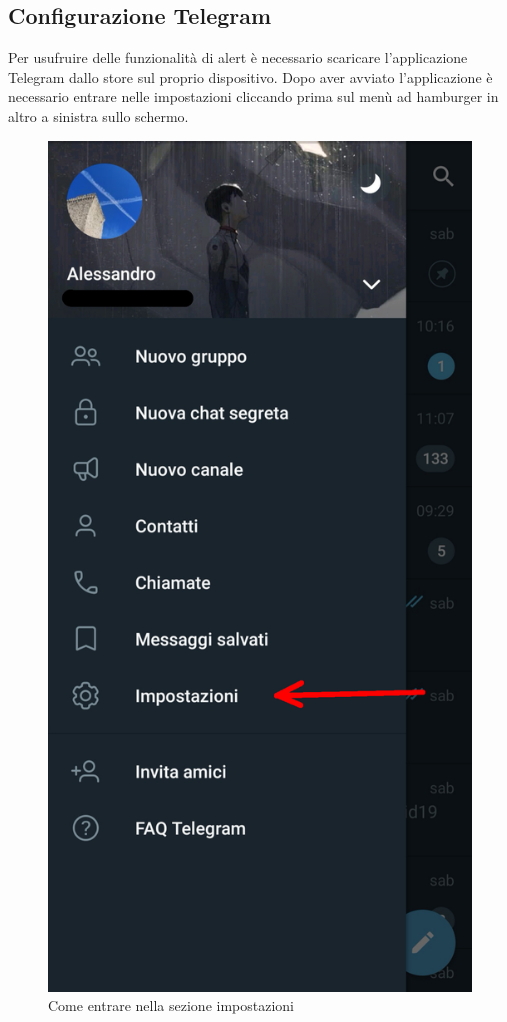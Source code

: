 \subsection{Configurazione Telegram}
	Per usufruire delle funzionalità di alert è necessario scaricare l'applicazione Telegram dallo store sul proprio dispositivo.
	Dopo aver avviato l'applicazione è necessario entrare nelle impostazioni cliccando prima sul menù ad hamburger in altro a sinistra sullo schermo.
	\begin{figure}[H]
		\centering
		\includegraphics[scale=0.100]{res/images/telegram1.jpg}
		\caption{Come entrare nella sezione impostazioni}
		\label{Screenshot1}
	\end{figure}

